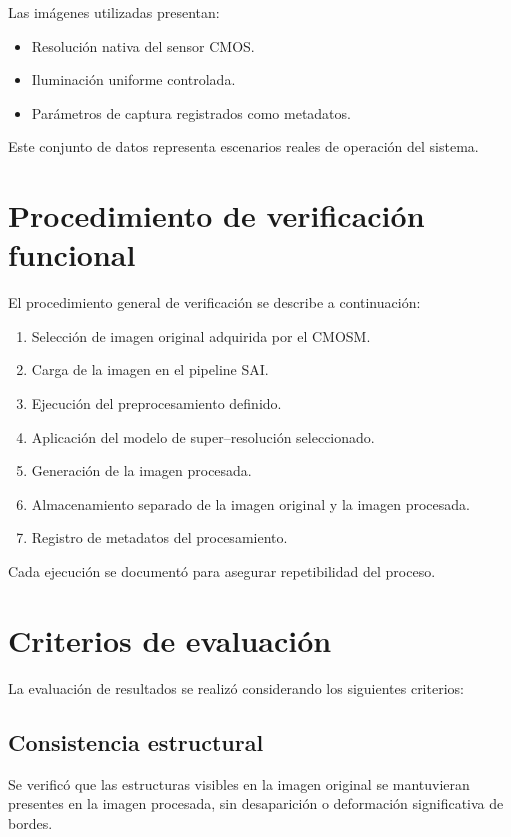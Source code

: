 Las imágenes utilizadas presentan:
\begin{itemize}
    \item Resolución nativa del sensor CMOS.
    \item Iluminación uniforme controlada.
    \item Parámetros de captura registrados como metadatos.
\end{itemize}

Este conjunto de datos representa escenarios reales de operación del sistema.

\section{Procedimiento de verificación funcional}

El procedimiento general de verificación se describe a continuación:

\begin{enumerate}
    \item Selección de imagen original adquirida por el CMOSM.
    \item Carga de la imagen en el pipeline SAI.
    \item Ejecución del preprocesamiento definido.
    \item Aplicación del modelo de super--resolución seleccionado.
    \item Generación de la imagen procesada.
    \item Almacenamiento separado de la imagen original y la imagen procesada.
    \item Registro de metadatos del procesamiento.
\end{enumerate}

Cada ejecución se documentó para asegurar repetibilidad del proceso.

\section{Criterios de evaluación}

La evaluación de resultados se realizó considerando los siguientes criterios:

\subsection{Consistencia estructural}
Se verificó que las estructuras visibles en la imagen original se mantuvieran
presentes en la imagen procesada, sin desaparición o deformación significativa
de bordes.

